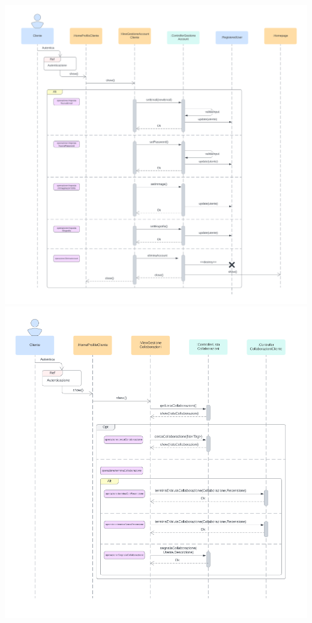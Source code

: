 \includegraphics[width=1\textwidth]{assets/img/sequenza/cliente-1.png}\\
\includegraphics[width=1\textwidth]{assets/img/sequenza/cliente-2.png}\\